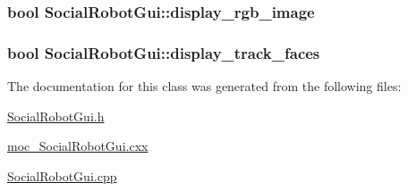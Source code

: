 \label{classSocialRobotGui_a57c8e1f9be7edfe29703853268aa8aba}
\hypertarget{classSocialRobotGui_a29d1ccc0fd91a27bdd56364aef82d351}{
\subsubsection[{display\_\-rgb\_\-image}]{\setlength{\rightskip}{0pt plus 5cm}bool {\bf SocialRobotGui::display\_\-rgb\_\-image}}}
\label{classSocialRobotGui_a29d1ccc0fd91a27bdd56364aef82d351}
\hypertarget{classSocialRobotGui_a28e6dc7627b92c85adb014bcaeb641bd}{
\subsubsection[{display\_\-track\_\-faces}]{\setlength{\rightskip}{0pt plus 5cm}bool {\bf SocialRobotGui::display\_\-track\_\-faces}}}
\label{classSocialRobotGui_a28e6dc7627b92c85adb014bcaeb641bd}


The documentation for this class was generated from the following files:\begin{DoxyCompactItemize}
\item 
\hyperlink{SocialRobotGui_8h}{SocialRobotGui.h}\item 
\hyperlink{moc__SocialRobotGui_8cxx}{moc\_\-SocialRobotGui.cxx}\item 
\hyperlink{SocialRobotGui_8cpp}{SocialRobotGui.cpp}\end{DoxyCompactItemize}

